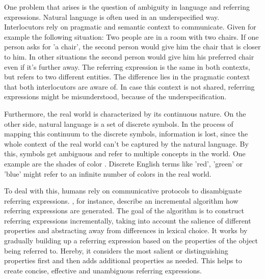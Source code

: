 One problem that arises is the question of ambiguity in language and referring expressions.
Natural language is often used in an underspecified way.
Interlocutors rely on pragmatic and semantic context to communicate.
Given for example the following situation:
Two people are in a room with two chairs.
If one person asks for 'a chair', the second person would give him the chair that is closer to him.
In other situations the second person would give him his preferred chair even if it's further away.
The referring expression is the same in both contexts, but refers to two different entities.
The difference lies in the pragmatic context that both interlocutors are aware of.
In case this context is not shared, referring expressions might be misunderstood, because of the underspecification.

Furthermore, the real world is characterized by its continuous nature.
On the other side, natural language is a set of discrete symbols.
In the process of mapping this continuum to the discrete symbols, information is lost, since the whole context of the real world can't be captured by the natural language.
By this, symbols get ambiguous and refer to multiple concepts in the world.
One example are the shades of color \citep{Zaslavsky2018}.
Discrete English terms like 'red', 'green' or 'blue' might refer to an infinite number of colors in the real world.

To deal with this, humans rely on communicative protocols to disambiguate referring expressions.
\citet{Dale1995}, for instance, describe an incremental algorithm how referring expressions are generated.
The goal of the algorithm is to construct referring expressions incrementally, taking into account the salience of different properties and abstracting away from differences in lexical choice.
It works by gradually building up a referring expression based on the properties of the object being referred to.
Hereby, it considers the most salient or distinguishing properties first and then adds additional properties as needed.
This helps to create concise, effective and unambiguous referring expressions.

